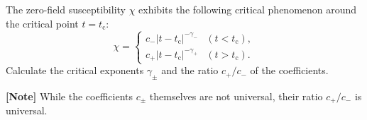 \documentclass[11pt,a4paper]{article}
\newcounter{problem}
\begin{document}
	\begin{problembox}
		The zero-field susceptibility $\chi$ exhibits the following critical phenomenon around the critical point $t = t_{\mathrm c}$:
		\begin{equation}
			\chi =
			\begin{cases}
				c_- |t - t_{\mathrm c}|^{-\gamma_-} & (t < t_{\mathrm c}), \\
				c_+ |t - t_{\mathrm c}|^{-\gamma_+} & (t > t_{\mathrm c}).
			\end{cases}
			\tag{4}
		\end{equation}
		Calculate the critical exponents $\gamma_{\pm}$ and the ratio $c_+/c_-$ of the coefficients.
		
		\medskip
		\textbf{[Note]} While the coefficients $c_{\pm}$ themselves are not universal, their ratio $c_+/c_-$ is universal.
	\end{problembox}
\end{document}
